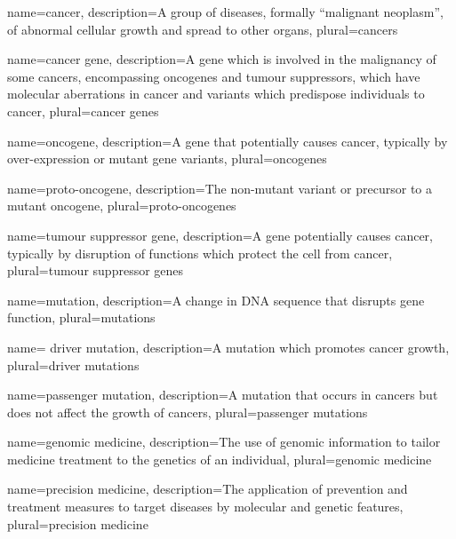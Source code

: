 
{
  name=cancer,
  description={A group of diseases, formally ``malignant neoplasm'', of abnormal cellular growth and spread to other organs},
  plural=cancers
}

{
  name=cancer gene,
  description={A gene which is involved in the malignancy of some cancers, encompassing \glspl{oncogene} and \glspl{tumour suppressor}, which have molecular aberrations in cancer and variants which predispose individuals to cancer},
  plural=cancer genes
}

{
  name=oncogene,
  description={A gene that potentially causes cancer, typically by over-expression or mutant gene variants},
  plural=oncogenes
}

{
  name=proto-oncogene,
  description={The non-mutant variant or precursor to a mutant \gls{oncogene}},
  plural=proto-oncogenes
}

{
  name=tumour suppressor gene,
  description={A gene potentially causes cancer, typically by disruption of functions which protect the cell from cancer},
  plural=tumour suppressor genes
}

{
  name=mutation,
  description={A change in DNA sequence that disrupts gene function},
  plural=mutations
}

{
  name= driver mutation,
  description={A \gls{mutation} which promotes cancer growth},
  plural=driver mutations
}

{
  name=passenger mutation,
  description={A \gls{mutation} that occurs in cancers but does not affect the growth of cancers},
  plural=passenger mutations
}

{
  name=genomic medicine,
  description={The use of genomic information to tailor medicine treatment to the genetics of an individual},
  plural=genomic medicine
}

{
  name=precision medicine,
  description={The application of prevention and treatment measures to target diseases by molecular and genetic features},
  plural=precision medicine
}


